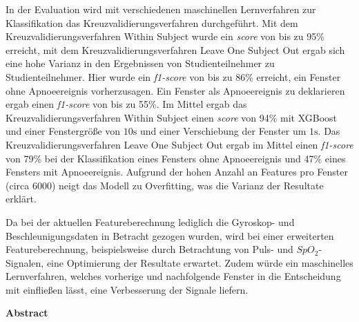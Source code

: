 In der Evaluation wird mit verschiedenen maschinellen Lernverfahren zur Klassifikation das Kreuzvalidierungsverfahren durchgeführt.
Mit dem Kreuzvalidierungsverfahren {\glqq Within Subject\grqq} wurde ein \textit{score} von bis zu 95\% erreicht, mit dem Kreuzvalidierungsverfahren {\glqq Leave One Subject Out\grqq} ergab sich eine hohe Varianz in den Ergebnissen von Studienteilnehmer zu Studienteilnehmer.
Hier wurde ein \textit{f1-score} von bis zu 86\% erreicht, ein Fenster ohne Apnoeereignis vorherzusagen. 
Ein Fenster als Apnoeereignis zu deklarieren ergab einen \textit{f1-score} von bis zu 55\%. 
Im Mittel ergab das Kreuzvalidierungsverfahren {\glqq Within Subject\grqq} einen \textit{score} von 94\% mit XGBoost und einer Fenstergröße von $10\si{\s}$ und einer Verschiebung der Fenster um $1\si{\s}$.
Das Kreuzvalidierungsverfahren {\glqq Leave One Subject Out\grqq} ergab im Mittel einen \textit{f1-score} von 79\% bei der Klassifikation eines Fensters ohne Apnoeereignis und 47\% eines Fensters mit Apnoeereignis.
Aufgrund der hohen Anzahl an Features pro Fenster (circa 6000) neigt das Modell zu Overfitting, was die Varianz der Resultate erklärt.

Da bei der aktuellen Featureberechnung lediglich die Gyroskop- und Beschleunigungsdaten in Betracht gezogen wurden, wird bei einer erweiterten Featureberechnung, beispielsweise      durch Betrachtung von Puls- und $SpO_2$-Signalen, eine Optimierung der Resultate erwartet.
Zudem würde ein maschinelles Lernverfahren, welches vorherige und nachfolgende Fenster in die Entscheidung mit einfließen lässt, eine Verbesserung der Signale liefern.



\cleardoublepage
\vspace*{1em}
\begin{center}
	\textbf{Abstract}
\end{center}

